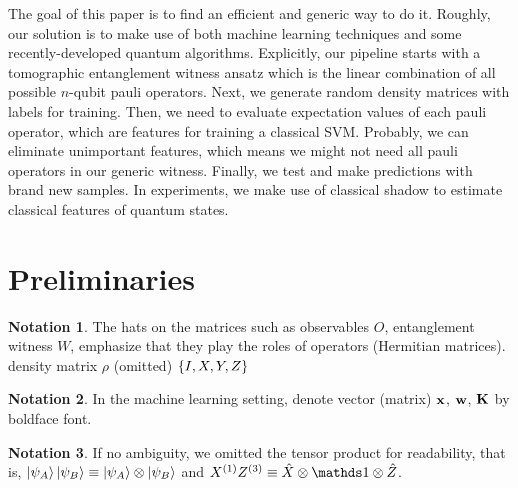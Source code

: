 \documentclass[
reprint,
aps,
pra,
]{revtex4-2}
\theoremstyle{plain}
\theoremstyle{definition}
\newtheorem{notation}{Notation}
\newcommand{\ew}{W}
\newcommand{\ob}{O}
\newcommand{\px}{X}
\newcommand{\pz}{Z}
\newcommand{\hamiltonian}{\hat{H}}
\newcommand{\dm}{\rho}
\begin{document}
The goal of this paper is to find an efficient and generic way to do it. Roughly, our solution is to make use of both machine learning techniques and some recently-developed quantum algorithms.
Explicitly, our pipeline starts with a tomographic entanglement witness ansatz which is the linear combination of all possible $n$-qubit pauli operators. 
Next, we generate random density matrices with labels for training. 
Then, we need to evaluate expectation values of each pauli operator, which are features for training a classical SVM. 
Probably, we can eliminate unimportant features, which means we might not need all pauli operators in our generic witness. 
Finally, we test and make predictions with brand new samples. 
In experiments, we make use of classical shadow \cite{huangPredictingManyProperties2020} to estimate classical features of quantum states.

\section{Preliminaries}
\begin{notation}
	The hats on the matrices such as
	observables $\ob$, entanglement witness $\ew$, 
	emphasize that they play the roles of operators (Hermitian matrices).
	density matrix $\dm$ (omitted)
	$\qty{I,X,Y,Z}$
\end{notation}
\begin{notation}
	In the machine learning setting,
	denote vector (matrix) $\vb{x}$, $\vb{w}$, $\vb{K}$ by boldface font.
\end{notation}
\begin{notation}
	If no ambiguity,
	we omitted the tensor product for readability,
	that is,
	$\ket{\psi_A}\ket{\psi_B}\equiv \ket{\psi_A}\otimes \ket{\psi_B}$ 
	and $\px^{(1)}\pz^{(3)} \equiv \hat{X} \otimes \identity \otimes \hat{Z}$.
\end{notation}
\end{document}
